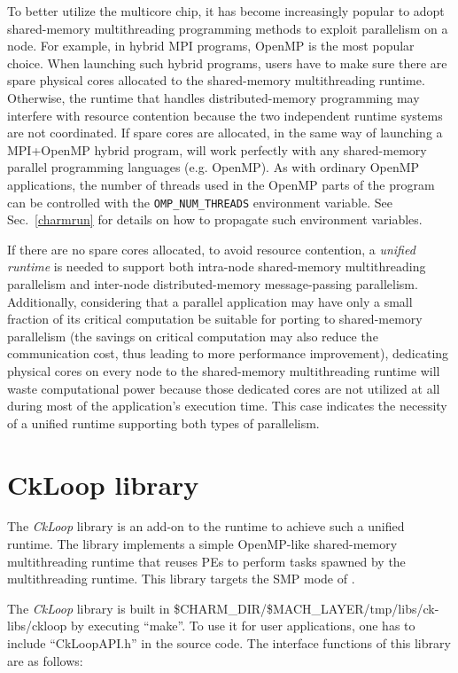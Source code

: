 To better utilize the multicore chip, it has become increasingly popular to
adopt shared-memory multithreading programming methods to exploit parallelism
on a node. For example, in hybrid MPI programs, OpenMP is the most popular
choice.  When launching such hybrid programs, users have to make sure there are
spare physical cores allocated to the shared-memory multithreading runtime.
Otherwise, the runtime that handles distributed-memory programming may
interfere with resource contention because the two independent runtime systems
are not coordinated.  If spare cores are allocated, in the same way of
launching a MPI+OpenMP hybrid program, \charmpp{} will work perfectly with any
shared-memory parallel programming languages (e.g. OpenMP). As with ordinary
OpenMP applications, the number of threads used in the OpenMP parts of the
program can be controlled with the {\tt OMP\_NUM\_THREADS} environment
variable.  See Sec.~\ref{charmrun} for details on how to propagate such
environment variables.

If there are no spare cores allocated, to avoid resource contention, a
\emph{unified runtime} is needed to support both intra-node shared-memory
multithreading parallelism and inter-node distributed-memory
message-passing parallelism. Additionally, considering that a parallel
application may have only a small fraction of its critical computation be
suitable for porting to shared-memory parallelism (the savings on critical
computation may also reduce the communication cost, thus leading to more
performance improvement), dedicating physical cores on every node to the
shared-memory multithreading runtime will waste computational power because
those dedicated cores are not utilized at all during most of the application's
execution time. This case indicates the necessity of a unified
runtime supporting both types of parallelism.
\section{CkLoop library}
The \emph{CkLoop} library is an add-on to the \charmpp{} runtime to achieve such
a unified runtime.  The library implements a simple OpenMP-like shared-memory
multithreading runtime that reuses \charmpp{} PEs to perform tasks spawned by
the multithreading runtime. This library targets the SMP mode of \charmpp{}.

The \emph{CkLoop} library is built in
\$CHARM\_DIR/\$MACH\_LAYER/tmp/libs/ck-libs/ckloop by executing ``make''.
To use it for user applications, one has to include ``CkLoopAPI.h'' in
the source code. The interface functions of this library are as
follows:

